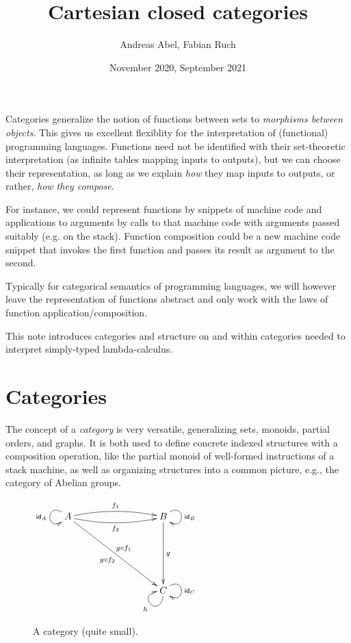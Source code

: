 \documentclass[a4paper,fleqn]{scrartcl}
\title{Cartesian closed categories}
\author{Andreas Abel, Fabian Ruch}
\date{November 2020, September 2021
     }
\theoremstyle{definition}
\begin{document}
\maketitle

Categories generalize the notion of functions between sets to
\emph{morphisms between objects}.  This gives us excellent flexiblity
for the interpretation of (functional) programming languages.
Functions need not be identified with their set-theoretic
interpretation (as infinite tables mapping inputs to outputs), but we
can choose their representation, as long as we explain \emph{how} they
map inputs to outputs, or rather, \emph{how they compose}.

For instance, we could represent functions by snippets of machine code
and applications to arguments by calls to that machine code with
arguments passed suitably (e.g. on the stack).  Function composition
could be a new machine code snippet that invokes the first function
and passes its result as argument to the second.

Typically for categorical semantics of programming languages, we will
however leave the representation of functions abstract and only work
with the laws of function application/composition.

This note introduces categories and structure on and within
categories needed to interpret simply-typed lambda-calculus.

\tableofcontents

\section{Categories}
\label{sec:cat}

The concept of a \emph{category} is very versatile, generalizing sets, monoids,
partial orders, and graphs.  It is both used to define concrete
indexed structures with a composition operation, like the partial
monoid of well-formed instructions of a stack machine, as well as
organizing structures into a common picture, e.g., the category of
Abelian groups.

\begin{figure}[htbp]
  \centering
  \(
  \xymatrix@R=15ex@C=20ex{
    A \ar@(ul,dl)_{\id[A]}
      \ar@/^/[r]^{f_1}
      \ar@/_/[r]_{f_2}
      \ar[dr]^{g \comp f_1}_{g \comp f_2}
    &
    B \ar@(ur,dr)^{\id[B]}
      \ar[d]^g
    \\ &
    C \ar@(ur,dr)^{\id[C]}
      \ar@(d,l)^h
  }
  \)
  \caption{A category (quite small).}
  \label{fig:cat}
\end{figure}
\end{document}
